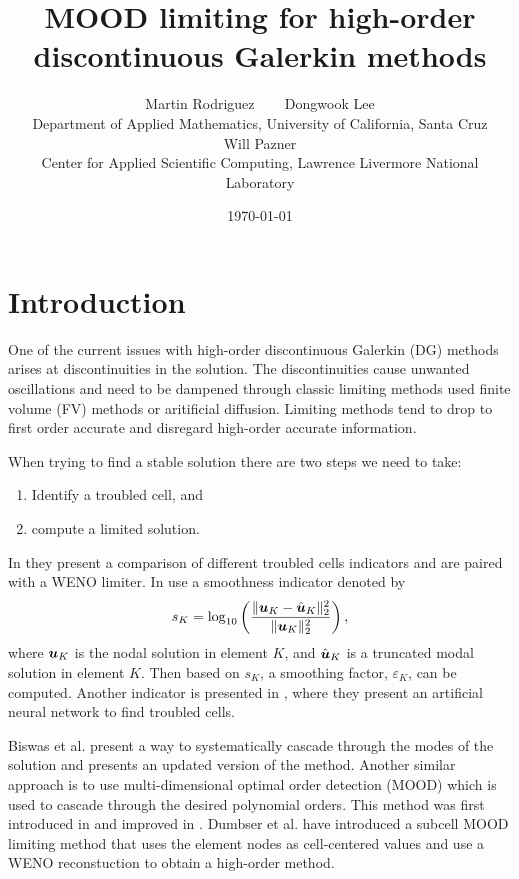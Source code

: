 \documentclass[11pt]{article}
\title{MOOD limiting for high-order discontinuous Galerkin methods}
\date{\today}
\author{Martin Rodriguez ~~~ Dongwook Lee \\ {\small Department of Applied Mathematics,  University of California, Santa Cruz} \\[11pt] Will Pazner \\ {\small Center for Applied Scientific Computing, Lawrence Livermore National Laboratory} }
\begin{document}
\maketitle

\onehalfspacing

\section{Introduction}


One of the current issues with high-order discontinuous Galerkin (DG) methods arises at discontinuities in the solution. The discontinuities cause unwanted oscillations and need to be dampened through classic limiting methods used finite volume (FV) methods or aritificial diffusion. Limiting methods tend to drop to first order accurate and disregard high-order accurate information. 

When trying to find a stable solution there are two steps we need to take: 
\begin{enumerate}[label=\roman*]
    \item Identify a troubled cell, and
    \item compute a limited solution.
\end{enumerate}
In \cite{qiu2005comparison} they present a comparison of different troubled cells indicators and are paired with a WENO limiter. In \cite{persson2006sub,pazner2021sparse} use a smoothness indicator denoted by
\begin{align}
    s_{K} = \log_{10}\left( \frac{ \| \boldsymbol{u}_K - \hat{\boldsymbol{u}}_K\|^2_2 }{ \| \boldsymbol{u}_K \|^2_2 } \right),
\end{align}
where $\boldsymbol{u}_K$ is the nodal solution in element $K$, and $\hat{\boldsymbol{u}}_K$ is a truncated modal solution in element $K$. Then based on $s_{K}$, a smoothing factor, $\varepsilon_K$, can be computed. Another indicator is presented in \cite{ray2018artificial}, where they present an artificial neural network to find troubled cells.

Biswas et al. \cite{biswas1994parallel} present a way to systematically cascade through the modes of the solution and \cite{krivodonova2007limiters} presents an updated version of the method. Another similar approach is to use multi-dimensional optimal order detection (MOOD) which is used to cascade through the desired polynomial orders. This method was first introduced in \cite{clainavery} and improved in \cite{diot2012improved}. Dumbser et al. \cite{dumbser2014posteriori} have introduced a subcell MOOD limiting method that uses the element nodes as cell-centered values and use a WENO reconstuction to obtain a high-order method.  
\end{document}
